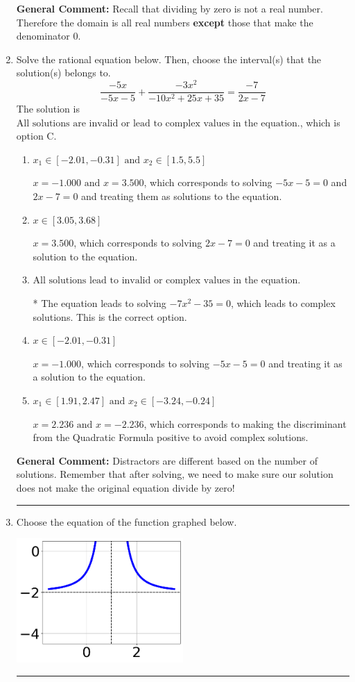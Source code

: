 \documentclass{extbook}[14pt]
\newcommand{\litem}[1]{\item #1

\rule{\textwidth}{0.4pt}}
\begin{document}
\begin{enumerate}
{\textbf{General Comment:} Recall that dividing by zero is not a real number. Therefore the domain is all real numbers \textbf{except} those that make the denominator 0.
}
\litem{
Solve the rational equation below. Then, choose the interval(s) that the solution(s) belongs to.
\[ \frac{-5x}{-5x -5} + \frac{-3x^{2}}{-10x^{2} +25 x + 35} = \frac{-7}{2x -7} \]The solution is \( \text{All solutions are invalid or lead to complex values in the equation.} \), which is option C.\begin{enumerate}[label=\Alph*.]
\item \( x_1 \in [-2.01, -0.31] \text{ and } x_2 \in [1.5,5.5] \)

$x = -1.000 \text{ and } x = 3.500$, which corresponds to solving $-5x -5 = 0$ and $2x -7 = 0$ and treating them as solutions to the equation.
\item \( x \in [3.05,3.68] \)

$x = 3.500$, which corresponds to solving $2x -7 = 0$ and treating it as a solution to the equation.
\item \( \text{All solutions lead to invalid or complex values in the equation.} \)

* The equation leads to solving $-7x^{2} -35=0$, which leads to complex solutions. This is the correct option.
\item \( x \in [-2.01,-0.31] \)

$x = -1.000$, which corresponds to solving $-5x -5 = 0$ and treating it as a solution to the equation.
\item \( x_1 \in [1.91, 2.47] \text{ and } x_2 \in [-3.24,-0.24] \)

$x = 2.236 \text{ and } x = -2.236$, which corresponds to making the discriminant from the Quadratic Formula positive to avoid complex solutions.
\end{enumerate}

\textbf{General Comment:} Distractors are different based on the number of solutions. Remember that after solving, we need to make sure our solution does not make the original equation divide by zero!
}
\litem{
Choose the equation of the function graphed below.

\begin{center}
    \includegraphics[width=0.5\textwidth]{../Figures/rationalGraphToEquationC.png}
\end{center}


}
\end{enumerate}
\end{document}
